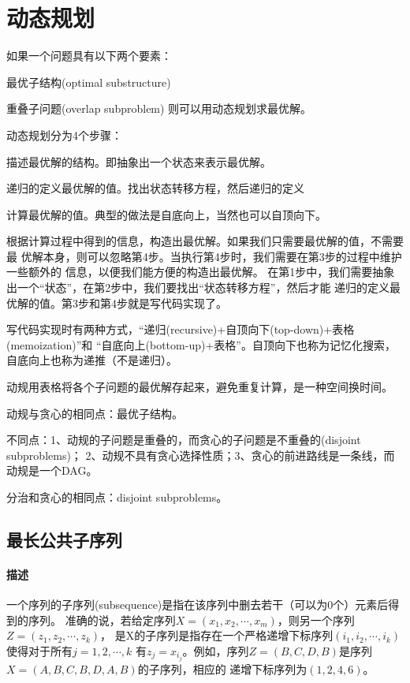 \chapter{动态规划}
如果一个问题具有以下两个要素：
\begindot
\item 最优子结构(optimal substructure)
\item 重叠子问题(overlap subproblem)
\myenddot
则可以用动态规划求最优解。

动态规划分为4个步骤：
\begindot
\item 描述最优解的结构。即抽象出一个状态来表示最优解。
\item 递归的定义最优解的值。找出状态转移方程，然后递归的定义
\item 计算最优解的值。典型的做法是自底向上，当然也可以自顶向下。
\item 根据计算过程中得到的信息，构造出最优解。如果我们只需要最优解的值，不需要最
优解本身，则可以忽略第4步。当执行第4步时，我们需要在第3步的过程中维护一些额外的
信息，以便我们能方便的构造出最优解。
\myenddot
在第1步中，我们需要抽象出一个“状态”，在第2步中，我们要找出“状态转移方程”，然后才能
递归的定义最优解的值。第3步和第4步就是写代码实现了。

写代码实现时有两种方式，“递归(recursive)+自顶向下(top-down)+表格(memoization)”和
“自底向上(bottom-up)+表格”。自顶向下也称为记忆化搜索，自底向上也称为递推（不是递归）。

动规用表格将各个子问题的最优解存起来，避免重复计算，是一种空间换时间。

动规与贪心的相同点：最优子结构。

不同点：1、动规的子问题是重叠的，而贪心的子问题是不重叠的(disjoint subproblems)；
2、动规不具有贪心选择性质；3、贪心的前进路线是一条线，而动规是一个DAG。

分治和贪心的相同点：disjoint subproblems。

\section{最长公共子序列} %
\subsubsection{描述}
一个序列的子序列(subsequence)是指在该序列中删去若干（可以为0个）元素后得到的序列。
准确的说，若给定序列$X=(x_1,x_2,\cdots,x_m)$，则另一个序列$Z=(z_1,z_2,\cdots,z_k)$，
是X的子序列是指存在一个严格递增下标序列$(i_1,i_2,\cdots,i_k)$使得对于所有$j=1,2,\cdots,k$
有$z_j=x_{i_j}$。例如，序列$Z=(B,C,D,B)$是序列$X=(A,B,C,B,D,A,B)$的子序列，相应的
递增下标序列为$(1,2,4,6)$。


